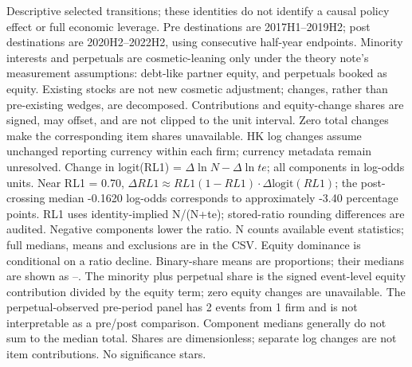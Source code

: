 \begin{table}[!htbp]
\begin{threeparttable}
\begin{tablenotes}[flushleft]
\item[] Descriptive selected transitions; these identities do not identify a causal policy effect or full economic leverage. Pre destinations are 2017H1--2019H2; post destinations are 2020H2--2022H2, using consecutive half-year endpoints. Minority interests and perpetuals are cosmetic-leaning only under the theory note's measurement assumptions: debt-like partner equity, and perpetuals booked as equity. Existing stocks are not new cosmetic adjustment; changes, rather than pre-existing wedges, are decomposed. Contributions and equity-change shares are signed, may offset, and are not clipped to the unit interval. Zero total changes make the corresponding item shares unavailable. HK log changes assume unchanged reporting currency within each firm; currency metadata remain unresolved. Change in logit(RL1) = $\Delta\ln N - \Delta\ln te$; all components in log-odds units. Near RL1 = 0.70, $\Delta RL1 \approx RL1(1-RL1)\cdot\Delta\mathrm{logit}(RL1)$; the post-crossing median -0.1620 log-odds corresponds to approximately -3.40 percentage points. RL1 uses identity-implied N/(N+te); stored-ratio rounding differences are audited. Negative components lower the ratio. N counts available event statistics; full medians, means and exclusions are in the CSV. Equity dominance is conditional on a ratio decline. Binary-share means are proportions; their medians are shown as --. The minority plus perpetual share is the signed event-level equity contribution divided by the equity term; zero equity changes are unavailable. The perpetual-observed pre-period panel has 2 events from 1 firm and is not interpretable as a pre/post comparison. Component medians generally do not sum to the median total. Shares are dimensionless; separate log changes are not item contributions. No significance stars.
\end{tablenotes}
\end{threeparttable}
\end{table}

